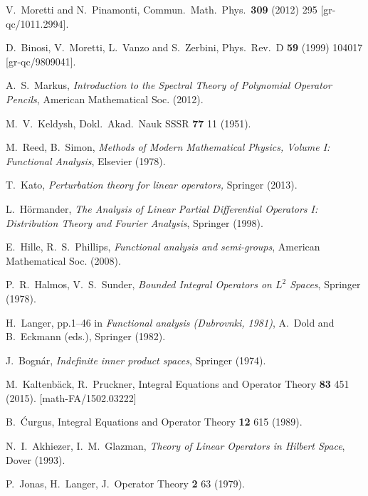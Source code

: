\documentclass[aps, prd, amsmath, floats, floatfix, twocolumn, nofootinbib, superscriptaddress, showpacs]{revtex4-1}
\begin{document}
\begin{thebibliography}{99}
V.~Moretti and N.~Pinamonti,
Commun.\ Math.\ Phys.\  {\bf 309} (2012) 295
[gr-qc/1011.2994].

D.~Binosi, V.~Moretti, L.~Vanzo and S.~Zerbini,
Phys.\ Rev.\ D {\bf 59} (1999) 104017
[gr-qc/9809041].

A.~S.~Markus,
{\it Introduction to the Spectral Theory of Polynomial Operator Pencils},
American Mathematical Soc. (2012).

M.~V.~Keldysh,
Dokl.\ Akad.\ Nauk SSSR {\bf 77} 11 (1951).

M.~Reed, B.~Simon,
{\it Methods of Modern Mathematical Physics, Volume I: Functional Analysis},
Elsevier (1978).

T.~Kato,
{\it Perturbation theory for linear operators,}
Springer (2013).

L.~H\"ormander,
{\it The Analysis of Linear Partial Differential Operators {I}: Distribution Theory and Fourier Analysis},
Springer (1998).

E.~Hille, R.~S.~Phillips,
{\it Functional analysis and semi-groups},
American Mathematical Soc. (2008).

P.~R.~Halmos, V.~S.~Sunder,
{\it Bounded Integral Operators on $L^2$ Spaces},
Springer (1978).

H.~Langer, pp.1--46
in {\it Functional analysis (Dubrovnki, 1981)}, A.~Dold and B.~Eckmann (eds.),
Springer (1982).

J.~Bogn\'{a}r,
{\it Indefinite inner product spaces},
Springer (1974).

M.~Kaltenb\"ack, R.~Pruckner,
Integral Equations and Operator Theory {\bf 83} 451 (2015).
[math-FA/1502.03222]

B.~\'{C}urgus,
Integral Equations and Operator Theory {\bf 12} 615 (1989).

N.~I.~Akhiezer, I.~M.~Glazman,
{\it Theory of Linear Operators in Hilbert Space},
Dover (1993).

P.~Jonas, H.~Langer,
J.\ Operator Theory {\bf 2} 63 (1979).

\end{thebibliography}
\end{document}
